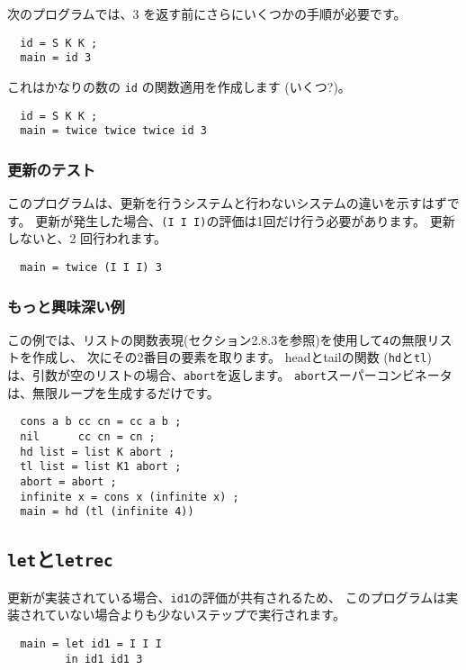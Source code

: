 \documentclass{jarticle}
\begin{document}
次のプログラムでは、3 を返す前にさらにいくつかの手順が必要です。

\begin{verbatim}
  id = S K K ;
  main = id 3
\end{verbatim}

これはかなりの数の \texttt{id} の関数適用を作成します (いくつ?)。

\begin{verbatim}
  id = S K K ;
  main = twice twice twice id 3
\end{verbatim}

\subsubsection{更新のテスト}

このプログラムは、更新を行うシステムと行わないシステムの違いを示すはずです。
更新が発生した場合、\texttt{(I I I)}の評価は1回だけ行う必要があります。
更新しないと、2 回行われます。

\begin{verbatim}
  main = twice (I I I) 3
\end{verbatim}

\subsubsection{もっと興味深い例}

この例では、リストの関数表現(セクション2.8.3を参照)を使用して\texttt{4}の無限リストを作成し、
次にその2番目の要素を取ります。
headとtailの関数 (\texttt{hd}と\texttt{tl}) は、引数が空のリストの場合、\texttt{abort}を返します。
\texttt{abort}スーパーコンビネータは、無限ループを生成するだけです。

\begin{verbatim}
  cons a b cc cn = cc a b ;
  nil      cc cn = cn ;
  hd list = list K abort ;
  tl list = list K1 abort ;
  abort = abort ;
  infinite x = cons x (infinite x) ;
  main = hd (tl (infinite 4))
\end{verbatim}
\newpage

\subsection{\texttt{let}と\texttt{letrec}}

更新が実装されている場合、\texttt{id1}の評価が共有されるため、
このプログラムは実装されていない場合よりも少ないステップで実行されます。

\begin{verbatim}
  main = let id1 = I I I
         in id1 id1 3
\end{verbatim}
\end{document}
